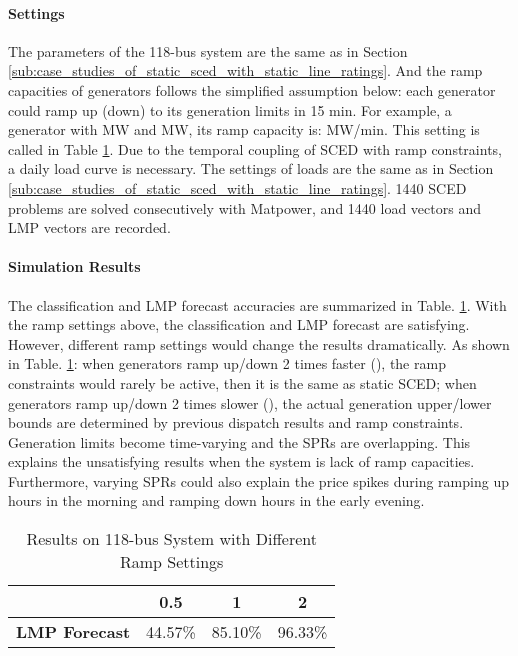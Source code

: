 \documentclass[letterpaper, 11pt]{article}
\theoremstyle{plain}
\theoremstyle{definition}
\begin{document}
\paragraph{Settings} \label{par:settings}
The parameters of the 118-bus system are the same as in Section \ref{sub:case_studies_of_static_sced_with_static_line_ratings}. And the ramp capacities of generators follows the simplified assumption below: each generator could ramp up (down) to its generation limits in 15 min. For example, a generator with MW and MW, its ramp capacity is: MW/min. This setting is called  in Table \ref{tab:118_bus_diff_ramp}.
Due to the temporal coupling of SCED with ramp constraints, a daily load curve is necessary.
The settings of loads are the same as in Section \ref{sub:case_studies_of_static_sced_with_static_line_ratings}. 1440 SCED problems are solved consecutively with Matpower, and 1440 load vectors and LMP vectors are recorded.
\paragraph{Simulation Results} \label{par:simulation_results}
The classification and LMP forecast accuracies are summarized in Table. \ref{tab:118_bus_diff_ramp}.
With the ramp settings above, the classification and LMP forecast are satisfying. 
However, different ramp settings would change the results dramatically. As shown in Table. \ref{tab:118_bus_diff_ramp}: when generators ramp up/down 2 times faster (), the ramp constraints would rarely be active, then it is the same as static SCED; when generators ramp up/down 2 times slower (), the actual generation upper/lower bounds are determined by previous dispatch results and ramp constraints. Generation limits become time-varying and the SPRs are overlapping. This explains the unsatisfying results when the system is lack of ramp capacities. Furthermore, varying SPRs could also explain the price spikes during ramping up hours in the morning and ramping down hours in the early evening.

\begin{table}[htbp]
  \caption{Results on 118-bus System with Different Ramp Settings}
  \label{tab:118_bus_diff_ramp}
  \centering

  \begin{tabular}{l|ccc}
  \hline

  \hline
   & 0.5 & 1 & 2 \\
  \hline
  \textbf{LMP Forecast} & 44.57\% & 85.10\% & 96.33\% \\
  \hline

  \hline
  \end{tabular}
\end{table}
\end{document}
